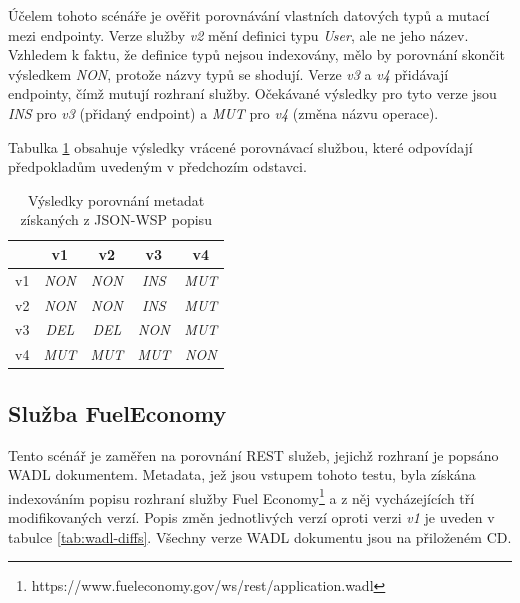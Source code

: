 \documentclass[czech,DP]{thesiskiv}
\begin{document}
Účelem tohoto scénáře je ověřit porovnávání vlastních datových typů a mutací mezi endpointy. Verze služby \textit{v2} mění definici typu \textit{User}, ale ne jeho název. Vzhledem k faktu, že definice typů nejsou indexovány, mělo by porovnání skončit výsledkem \textit{NON}, protože názvy typů se shodují. Verze \textit{v3} a \textit{v4} přidávají endpointy, čímž mutují rozhraní služby. Očekávané výsledky pro tyto verze jsou \textit{INS} pro \textit{v3} (přidaný endpoint) a \textit{MUT} pro \textit{v4} (změna názvu operace).

Tabulka \ref{tab:jsonwsp-cmp-res} obsahuje výsledky vrácené porovnávací službou, které odpovídají předpokladům uvedeným v předchozím odstavci.

\begin{table}[h]
	\centering
	\begin{tabular}{|l||c|c|c|c|}
		\hline
		& v1 & v2 & v3 & v4 \\
		\hline
		\hline
		v1 & \textit{NON} & \textit{NON} & \textit{INS} & \textit{MUT} \\
		\hline
		v2 & \textit{NON} & \textit{NON} & \textit{INS} & \textit{MUT} \\
		\hline
		v3 & \textit{DEL} & \textit{DEL} & \textit{NON} & \textit{MUT} \\
		\hline
		v4 & \textit{MUT} & \textit{MUT} & \textit{MUT} & \textit{NON} \\
		\hline
	\end{tabular}
	\caption{Výsledky porovnání metadat získaných z JSON-WSP popisu}
	\label{tab:jsonwsp-cmp-res}
\end{table}


\subsection{Služba FuelEconomy}

Tento scénář je zaměřen na porovnání REST služeb, jejichž rozhraní je popsáno WADL dokumentem. Metadata, jež jsou vstupem tohoto testu, byla získána indexováním popisu rozhraní služby Fuel Economy\footnote{https://www.fueleconomy.gov/ws/rest/application.wadl} a z něj vycházejících tří modifikovaných verzí. Popis změn jednotlivých verzí oproti verzi \textit{v1} je uveden v tabulce \ref{tab:wadl-diffs}. Všechny verze WADL dokumentu jsou na přiloženém CD.
\end{document}
